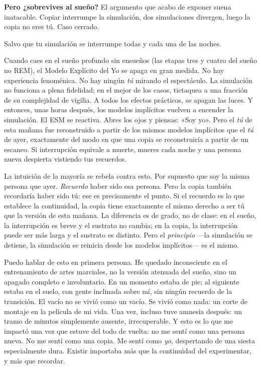 \documentclass[11pt, twoside, openright]{book}
\begin{document}
\textbf{Pero ¿sobrevives al sueño?} El argumento que acabo de exponer suena inatacable. Copiar interrumpe la simulación, dos simulaciones divergen, luego la copia no eres tú. Caso cerrado.

Salvo que tu simulación se interrumpe todas y cada una de las noches.

Cuando caes en el sueño profundo sin ensueños (las etapas tres y cuatro del sueño no REM), el Modelo Explícito del Yo se apaga en gran medida. No hay experiencia fenoménica. No hay ningún \textit{tú} mirando el espectáculo. La simulación no funciona a plena fidelidad; en el mejor de los casos, tictaquea a una fracción de su complejidad de vigilia. A todos los efectos prácticos, se apagan las luces. Y entonces, unas horas después, los modelos implícitos vuelven a encender la simulación. El ESM se reactiva. Abres los ojos y piensas: «Soy yo». Pero el \textit{tú} de esta mañana fue reconstruido a partir de los mismos modelos implícitos que el \textit{tú} de ayer, exactamente del modo en que una copia se reconstruiría a partir de un escaneo. Si interrupción equivale a muerte, mueres cada noche y una persona nueva despierta vistiendo tus recuerdos.

La intuición de la mayoría se rebela contra esto. Por supuesto que soy la misma persona que ayer. \textit{Recuerdo} haber sido esa persona. Pero la copia también recordaría haber sido tú: ese es precisamente el punto. Si el recuerdo es lo que establece la continuidad, la copia tiene exactamente el mismo derecho a ser tú que la versión de esta mañana. La diferencia es de grado, no de clase: en el sueño, la interrupción es breve y el sustrato no cambia; en la copia, la interrupción puede ser más larga y el sustrato es distinto. Pero el \textit{principio} ---la simulación se detiene, la simulación se reinicia desde los modelos implícitos--- es el mismo.

Puedo hablar de esto en primera persona. He quedado inconsciente en el entrenamiento de artes marciales, no la versión atenuada del sueño, sino un apagado completo e involuntario. En un momento estaba de pie; al siguiente estaba en el suelo, con gente inclinada sobre mí, sin ningún recuerdo de la transición. El vacío no se vivió como un vacío. Se vivió como nada: un corte de montaje en la película de mi vida. Una vez, incluso tuve amnesia después: un tramo de minutos simplemente ausente, irrecuperable. Y esto es lo que me impactó una vez que estuve del todo de vuelta: no me sentí como una persona nueva. No me sentí como una copia. Me sentí como \textit{yo}, despertando de una siesta especialmente dura. Existir importaba más que la continuidad del experimentar, y más que recordar.
\end{document}
